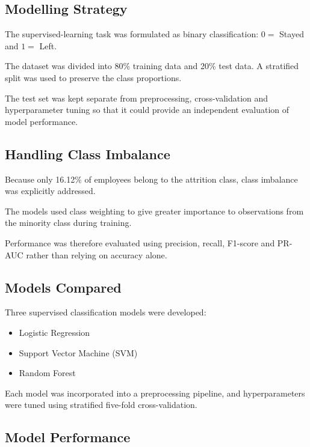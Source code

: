 \documentclass[11pt]{article}
\begin{document}
\subsection{Modelling Strategy}

The supervised-learning task was formulated as binary classification: $0 = $ Stayed and $1 = $ Left.

The dataset was divided into 80\% training data and 20\% test data. A stratified split was used to preserve the class proportions.

The test set was kept separate from preprocessing, cross-validation and hyperparameter tuning so that it could provide an independent evaluation of model performance.


\subsection{Handling Class Imbalance}

Because only 16.12\% of employees belong to the attrition class, class imbalance was explicitly addressed.

The models used class weighting to give greater importance to observations from the minority class during training.

Performance was therefore evaluated using precision, recall, F1-score and PR-AUC rather than relying on accuracy alone.

\subsection{Models Compared}

Three supervised classification models were developed:

\begin{itemize}
    \item Logistic Regression
    \item Support Vector Machine (SVM)
    \item Random Forest
\end{itemize}

Each model was incorporated into a preprocessing pipeline, and hyperparameters were tuned using stratified five-fold cross-validation.



\subsection{Model Performance}
\end{document}
